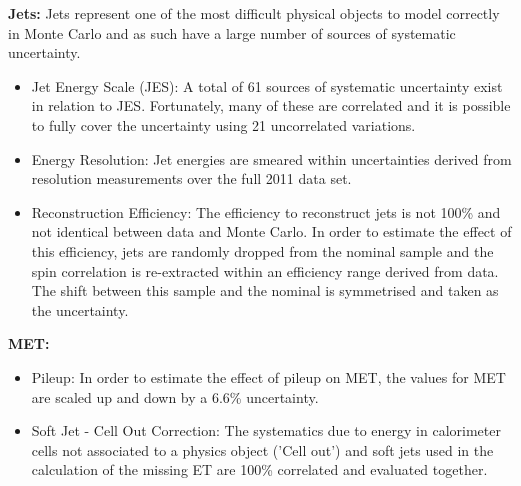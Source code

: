 \vspace{5mm}
\noindent
\textbf{Jets:}
Jets represent one of the most difficult physical objects to model correctly in Monte Carlo and as such have a large number of sources of systematic uncertainty. 
\begin{itemize}
    \item Jet Energy Scale (JES): A total of 61 sources of systematic uncertainty exist in relation to JES. Fortunately, many of these are correlated and it is possible to fully cover the uncertainty using 21 uncorrelated variations.
    \item Energy Resolution: Jet energies are smeared within uncertainties derived from resolution measurements over the full 2011 data set. 
    \item Reconstruction Efficiency: The efficiency to reconstruct jets is not 100\% and not identical between data and Monte Carlo. In order to estimate the effect of this efficiency, jets are randomly dropped from the nominal sample and the spin correlation is re-extracted within an efficiency range derived from data. The shift between this sample and the nominal is symmetrised and taken as the uncertainty.
\end{itemize}

\vspace{5mm}
\noindent
\textbf{MET:}
\begin{itemize}
    \item Pileup: In order to estimate the effect of pileup on MET, the values for MET are scaled up and down by a 6.6\% uncertainty. 
    \item Soft Jet - Cell Out Correction: The systematics due to energy in calorimeter cells not associated to a physics object ('Cell out') and soft jets used in the calculation of the missing ET are 100\% correlated and evaluated together. 
\end{itemize}


